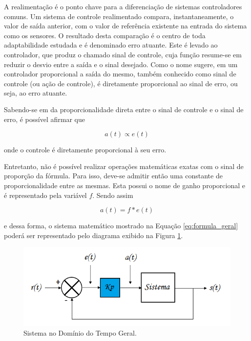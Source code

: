 \documentclass[portugues, brazil, a4paper,12pt]{article}
\begin{document}
		A realimentação é o ponto chave para a diferenciação de sistemas controladores comuns. Um sistema de controle realimentado compara, instantaneamente, o valor de saída anterior, com o valor de referência existente na entrada do sistema como os sensores. O resultado desta comparação é o centro de toda adaptabilidade estudada e é denominado erro atuante. Este é levado ao controlador, que produz o chamado sinal de controle, cuja função resume-se em reduzir o desvio entre a saída e o sinal desejado. Como o nome sugere, em um controlador proporcional a saída do mesmo, também conhecido como sinal de controle (ou ação de controle), é diretamente proporcional ao sinal de erro, ou seja, ao erro atuante.

		Sabendo-se em da proporcionalidade direta entre o sinal de controle e o sinal de erro, é possível afirmar que

		\begin{equation}
			a(t) \propto e(t)
		\end{equation}

		onde o controle é diretamente proporcional à seu erro.

		Entretanto, não é possível realizar operações matemáticas exatas com o sinal de proporção da fórmula. Para isso, deve-se admitir então uma constante de proporcionalidade entre as mesmas. Esta possui o nome de ganho proporcional e é representado pela variável $f$. Sendo assim

		\begin{equation}
			a(t) = f * e(t) \label{eq:formula_geral}
		\end{equation}

		e dessa forma, o sistema matemático mostrado na Equação \ref{eq:formula_geral} poderá ser representado pelo diagrama exibido na Figura \ref{fig:sistema_dominio_tempo}.

		\begin{figure}[h]
			\centering
			\includegraphics[width=\linewidth]{img/math-diagrama_geral.png}
			\caption{Sistema no Domínio do Tempo Geral.}
			\label{fig:sistema_dominio_tempo}
		\end{figure}
\end{document}
